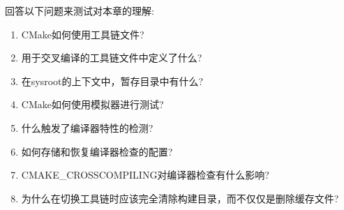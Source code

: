 回答以下问题来测试对本章的理解:

\begin{enumerate}
\item 
CMake如何使用工具链文件?

\item 
用于交叉编译的工具链文件中定义了什么?

\item 
在sysroot的上下文中，暂存目录中有什么?

\item 
CMake如何使用模拟器进行测试?

\item 
什么触发了编译器特性的检测?

\item 
如何存储和恢复编译器检查的配置?

\item 
CMAKE\_CROSSCOMPILING对编译器检查有什么影响?

\item 
为什么在切换工具链时应该完全清除构建目录，而不仅仅是删除缓存文件?
\end{enumerate}